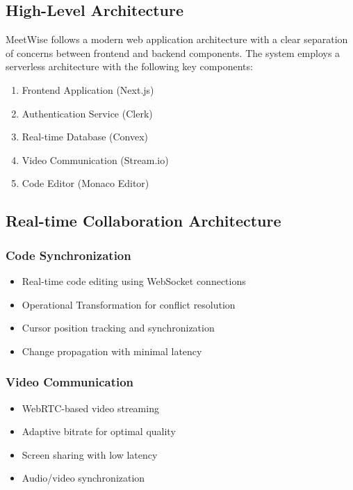 \documentclass[12pt,a4paper]{report}
\begin{document}
\subsection{High-Level Architecture}
MeetWise follows a modern web application architecture with a clear separation of concerns between frontend and backend components. The system employs a serverless architecture with the following key components:

\begin{enumerate}
    \item Frontend Application (Next.js)
    \item Authentication Service (Clerk)
    \item Real-time Database (Convex)
    \item Video Communication (Stream.io)
    \item Code Editor (Monaco Editor)
\end{enumerate}

\subsection{Real-time Collaboration Architecture}
\subsubsection{Code Synchronization}
\begin{itemize}
   \item Real-time code editing using WebSocket connections
   \item Operational Transformation for conflict resolution
   \item Cursor position tracking and synchronization
   \item Change propagation with minimal latency
\end{itemize}

\subsubsection{Video Communication}
\begin{itemize}
   \item WebRTC-based video streaming
   \item Adaptive bitrate for optimal quality
   \item Screen sharing with low latency
   \item Audio/video synchronization
\end{itemize}
\end{document}
